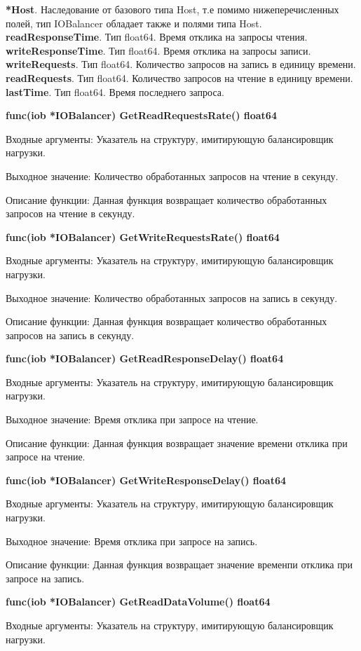 \textbf{	*Host}. Наследование от базового типа Host, т.е помимо нижеперечисленных полей, тип IOBalancer обладает также и полями типа Host. 
\textbf{	readResponseTime}. Тип float64. Время отклика на запросы чтения.
\textbf{	writeResponseTime}. Тип float64. Время отклика на запросы записи.
\textbf{	writeRequests}. Тип float64. Количество запросов на запись в единицу времени.
\textbf{	readRequests}. Тип  float64. Количество запросов на чтение в единицу времени.
\textbf{	lastTime}. Тип float64. Время последнего запроса. 


\textbf{func(iob *IOBalancer) GetReadRequestsRate() float64}

Входные аргументы: Указатель на структуру, имитирующую балансировщик нагрузки.

Выходное значение: Количество обработанных запросов на чтение в секунду.

Описание функции: Данная функция возвращает количество обработанных запросов на чтение в секунду.

\textbf{func(iob *IOBalancer) GetWriteRequestsRate() float64}

Входные аргументы: Указатель на структуру, имитирующую балансировщик нагрузки.

Выходное значение: Количество обработанных запросов на запись в секунду. 

Описание функции: Данная функция возвращает количество обработанных запросов на запись в секунду.

\textbf{func(iob *IOBalancer) GetReadResponseDelay() float64}

Входные аргументы: Указатель на структуру, имитирующую балансировщик нагрузки.

Выходное значение: Время отклика при запросе на чтение. 

Описание функции: Данная функция возвращает значение времени отклика при запросе на чтение.

\textbf{func(iob *IOBalancer) GetWriteResponseDelay() float64}

Входные аргументы: Указатель на структуру, имитирующую балансировщик нагрузки.

Выходное значение: Время отклика при запросе на запись.

Описание функции: Данная функция возвращает значение временпи отклика при запросе на запись.

\textbf{func(iob *IOBalancer) GetReadDataVolume() float64}

Входные аргументы: Указатель на структуру, имитирующую балансировщик нагрузки.

